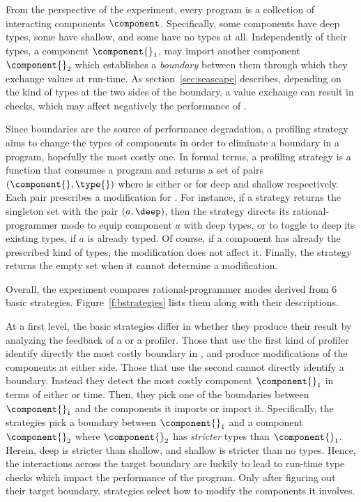 
From the perspective of the experiment, every program \program{} is a
collection of interacting components $\component$. Specifically, some
components have deep types, some  have shallow, and some  have no types at
all. Independently of their types, a component $\component{}_1$, may import
another component $\component{}_2$  which establishes a
\emph{boundary} between them through which they exchange values at
run-time. As section~\ref{sec:seascape} describes, depending on the kind of types at
the two sides of the boundary, a value exchange can result in checks,
which may affect negatively the performance of \program{}. 

 Since boundaries are the source of performance degradation, a profiling
 strategy aims to change the types of components in order to eliminate a
 boundary in a program, hopefully the most costly one. In formal terms, a
 profiling strategy is a function that consumes a program \program{} and
 returns a set of pairs $(\component{}, \type{})$ where \type{} is either
 \deep{} or \shallow{} for deep and shallow respectively. Each pair
 prescribes a modification for \program{}. For instance, if a strategy
 returns the singleton set with the pair $(a,\deep)$, then the strategy
 directs its rational-programmer mode to equip component $a$ with deep
 types, or to toggle to deep its existing types, if $a$ is already typed.
 Of course, if a component has already the prescribed kind of types, the
 modification does not affect it. Finally, the strategy returns the empty
 set when it cannot determine a modification.

 Overall, the experiment compares rational-programmer modes
 derived from 6 basic strategies. Figure~\ref{f:bstrategies}
 lists them along with their descriptions.

 At a first level, the basic strategies differ in whether they produce their
 result by analyzing the feedback of a \featkw{} or a \statkw{} profiler.
 Those that use the first kind of profiler identify directly the most
 costly boundary in \program{}, and produce modifications of the
 components at either side.  Those that use the second cannot directly
 identify a boundary.  Instead they detect the most costly component
 $\component{}_1$ in terms of either \selfkw{} or \totalkw{} time.  Then,
 they pick  one of the boundaries between $\component{}_1$ and the components it
 imports or import it.  Specifically, the strategies pick a boundary
 between $\component{}_1$ and a component $\component{}_2$ where
 $\component{}_2$
 has \emph{stricter} types than $\component{}_1$. Herein, deep is stricter
 than shallow, and shallow is stricter than no types.  Hence, the
 interactions across the target boundary are luckily to lead to run-time
 type checks which impact the performance of the program.  Only after
 figuring out their target boundary, \statkw{} strategies select how to
 modify the components it involves.

